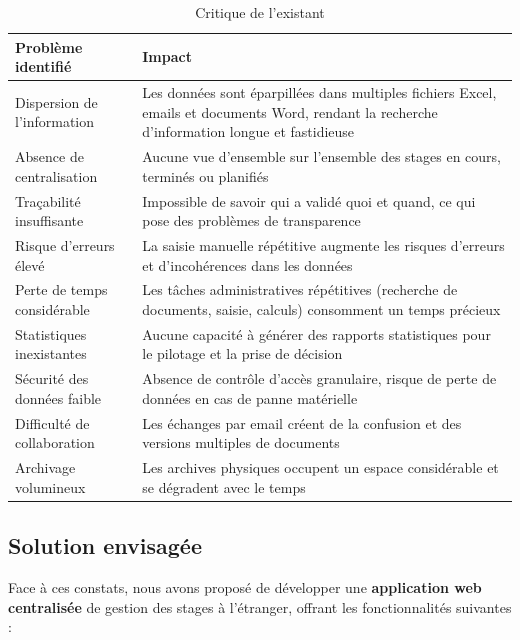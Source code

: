 \documentclass[12pt,a4paper]{report}
\begin{document}
\begin{table}[H]
\centering
\renewcommand{\arraystretch}{1.5}
\begin{tabularx}{\textwidth}{|>{\hsize=0.3\hsize}X|>{\hsize=0.7\hsize}X|}
\hline
\textbf{Problème identifié} & \textbf{Impact} \\
\hline
Dispersion de l'information & Les données sont éparpillées dans multiples fichiers Excel, emails et documents Word, rendant la recherche d'information longue et fastidieuse \\
\hline
Absence de centralisation & Aucune vue d'ensemble sur l'ensemble des stages en cours, terminés ou planifiés \\
\hline
Traçabilité insuffisante & Impossible de savoir qui a validé quoi et quand, ce qui pose des problèmes de transparence \\
\hline
Risque d'erreurs élevé & La saisie manuelle répétitive augmente les risques d'erreurs et d'incohérences dans les données \\
\hline
Perte de temps considérable & Les tâches administratives répétitives (recherche de documents, saisie, calculs) consomment un temps précieux \\
\hline
Statistiques inexistantes & Aucune capacité à générer des rapports statistiques pour le pilotage et la prise de décision \\
\hline
Sécurité des données faible & Absence de contrôle d'accès granulaire, risque de perte de données en cas de panne matérielle \\
\hline
Difficulté de collaboration & Les échanges par email créent de la confusion et des versions multiples de documents \\
\hline
Archivage volumineux & Les archives physiques occupent un espace considérable et se dégradent avec le temps \\
\hline
\end{tabularx}
\caption{Critique de l'existant}
\end{table}

\subsection{Solution envisagée}

Face à ces constats, nous avons proposé de développer une \textbf{application web centralisée} de gestion des stages à l'étranger, offrant les fonctionnalités suivantes :
\end{document}
